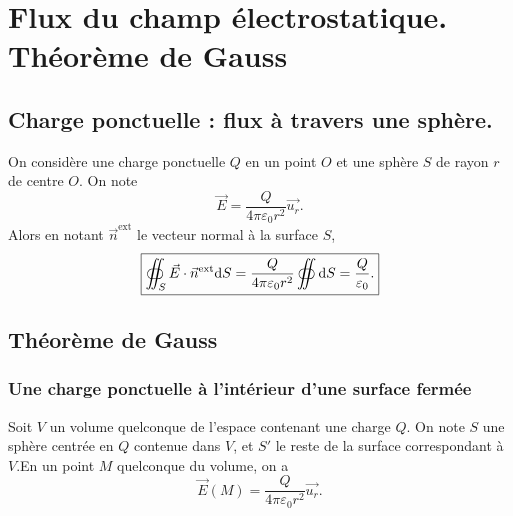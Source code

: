 \section{Flux du champ électrostatique. Théorème de Gauss}

    \subsection{Charge ponctuelle : flux à travers une sphère.}

        On considère une charge ponctuelle $Q$ en un point $O$ et une sphère $S$ de rayon $r$ de centre $O$. On note
        \begin{equation*}
            \vec{E}=\frac{Q}{4\pi\varepsilon_{0}r^{2}}\vec{u_r}.
        \end{equation*}
        Alors en notant $\vec{n}^{\text{ext}}$ le vecteur normal à la surface $S$,
        \begin{equation*}
            \boxed{
                \oiint_{S}\vec{E}\cdot\vec{n}^{\text{ext}}\mathrm{d} S=\frac{Q}{4\pi\varepsilon_{0}r^{2}}\oiint\mathrm{d} S=\frac{Q}{\varepsilon_{0}}.
            }
        \end{equation*}

    \subsection{Théorème de Gauss}
        \subsubsection{Une charge ponctuelle à l'intérieur d'une surface fermée}

            Soit $V$ un volume quelconque de l'espace contenant une charge $Q$. On note $S$ une sphère centrée en $Q$ contenue dans $V$, et $S'$ le reste de la surface correspondant à $V$.En un point $M$ quelconque du volume, on a
            \begin{equation*}
                \vec{E}(M)=\frac{Q}{4\pi\varepsilon_{0}r^{2}}\vec{u_r}.
            \end{equation*}

